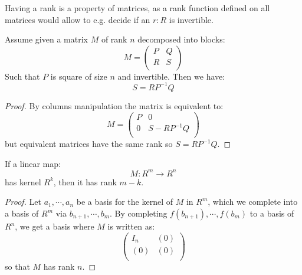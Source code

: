 Having a rank is a property of matrices, as a rank function defined on all matrices would allow to e.g. decide if an $r:R$ is invertible.

\begin{lemma}\label{rank-bloc-matrix}
Assume given a matrix $M$ of rank $n$ decomposed into blocks:
\[M = \begin{pmatrix}
P & Q  \\
R & S \\
\end{pmatrix}\]
Such that $P$ is square of size $n$ and invertible. Then we have:
\[S = RP^{-1}Q\]
\end{lemma}

\begin{proof}
By columns manipulation the matrix is equivalent to:
\[M = \begin{pmatrix}
P & 0  \\
0 & S - RP^{-1}Q \\
\end{pmatrix}\]
but equivalent matrices have the same rank so $S=RP^{-1}Q$.
\end{proof}

\begin{lemma}\label{rank-equivalent-definitions}
If a linear map:
\[M:R^m \to R^n\]
has kernel $R^k$, then it has rank $m-k$.
\end{lemma}

\begin{proof}
Let $a_1,\cdots,a_n$ be a basis for the kernel of $M$ in $R^m$, which we complete into a basis of $R^m$ via $b_{n+1},\cdots,b_m$. By completing $f(b_{n+1}),\cdots, f(b_m)$ to a basis of $R^n$, we get a basis where $M$ is written as:
\[\begin{pmatrix}
I_n & (0)  \\
(0) & (0) \\
\end{pmatrix}\]
so that $M$ has rank $n$.
\end{proof}









